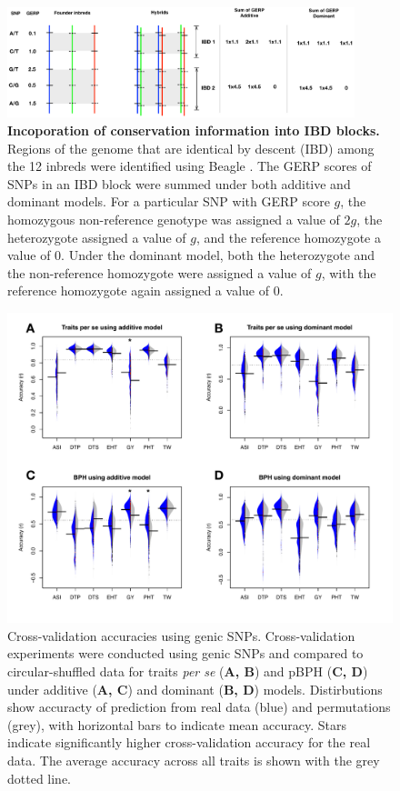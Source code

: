 \documentclass[9pt,twocolumn,twoside]{gsajnl}
\begin{document}
\begin{figure}[htbp]
\includegraphics[width=0.9\textwidth]{SFig_gerpIBD.pdf}
\caption{
\textbf{Incoporation of conservation information into IBD blocks.}
Regions of the genome that are identical by descent (IBD) among the 12 inbreds were identified using Beagle \citep{Browning2009}.  The GERP scores of SNPs in an IBD block were summed under both additive and dominant models. For a particular SNP with GERP score $g$, the homozygous non-reference genotype was assigned a value of $2g$, the heterozygote assigned a value of $g$, and the reference homozygote a value of 0.  Under the dominant model, both the heterozygote and the non-reference homozygote were assigned a value of $g$, with the reference homozygote again assigned a value of 0.}
\label{fig:gerpibd}
\end{figure}

\begin{figure}[htbp]
\centering
\includegraphics[width=\linewidth]{SFig_genicsnp_m.pdf}
\caption{Cross-validation accuracies using genic SNPs. Cross-validation experiments were conducted using genic SNPs and compared to circular-shuffled data for traits \emph{per se} (\textbf{A, B}) and pBPH (\textbf{C, D}) under additive (\textbf{A, C}) and dominant (\textbf{B, D}) models. Distirbutions show accuracty of prediction from real data (blue) and permutations (grey), with horizontal bars to indicate mean accuracy.  Stars indicate significantly higher cross-validation accuracy for the real data.  The average accuracy across all traits is shown with the grey dotted line. }
\label{fig:genicsnp}
\end{figure}
\end{document}
